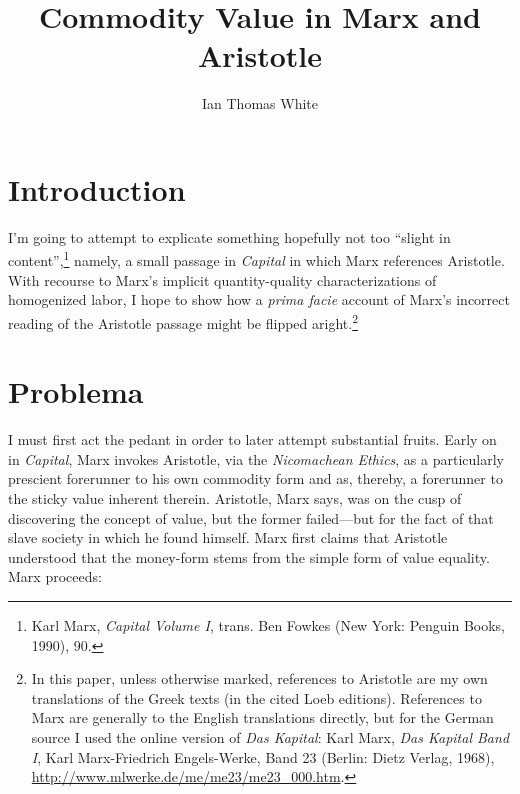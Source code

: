 \documentclass[12pt]{article}
\title{Commodity Value in Marx and Aristotle}
\author{Ian Thomas White}
\date{}
\makeatletter
\renewcommand{\maketitle}
{
\begin{flushleft}
\textbf{{\large\@title}}
\newline
\@author
\end{flushleft}
}
\makeatother
\begin{document}
\thispagestyle{empty}

\begin{singlespacing}
\maketitle
\tableofcontents
\end{singlespacing}

\newpage

\section{Introduction}
I'm going to attempt to explicate something hopefully not too ``slight in content'',\footnote{Karl Marx, \textit{Capital Volume I}, trans. Ben Fowkes (New York: Penguin Books, 1990), 90.} namely, a small passage in \textit{Capital} in which Marx references Aristotle. With recourse to Marx's implicit quantity-quality characterizations of homogenized labor, I hope to show how a \textit{prima facie} account of Marx's incorrect reading of the Aristotle passage might be flipped aright.\footnote{In this paper, unless otherwise marked, references to Aristotle are my own translations of the Greek texts (in the cited Loeb editions). References to Marx are generally to the English translations directly, but for the German source I used the online version of \textit{Das Kapital}: Karl Marx, \textit{Das Kapital Band I}, Karl Marx-Friedrich Engels-Werke, Band 23 (Berlin: Dietz Verlag, 1968),  \url{http://www.mlwerke.de/me/me23/me23\_000.htm}.}

\section{Problema}
I must first act the pedant in order to later attempt substantial fruits. Early on in \textit{Capital}, Marx invokes Aristotle, via the \textit{Nicomachean Ethics}, as a particularly prescient forerunner to his own commodity form and as, thereby, a forerunner to the sticky value inherent therein. Aristotle, Marx says, was on the cusp of discovering the concept of value, but the former failed---but for the fact of that slave society in which he found himself. Marx first claims that Aristotle understood that the money-form stems from the simple form of value equality. Marx proceeds:  
\end{document}
